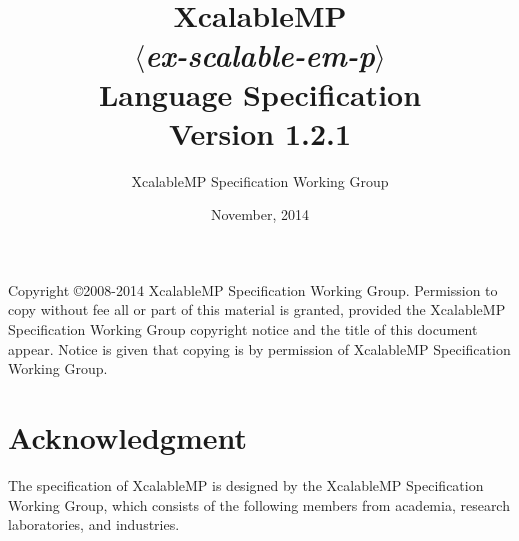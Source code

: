 \documentclass[a4paper,11pt,twoside]{report}
\title{{\Huge XcalableMP}\\
$\langle${\it ex-scalable-em-p}$\rangle$\\
Language Specification\\
\vspace{2cm}
Version 1.2.1\\}
\author{
\Large XcalableMP Specification Working Group\\
}
\date{\vspace{4cm}\Large November, 2014}
\def\XMP{XcalableMP}
\begin{document}
\maketitle

Copyright \copyright 2008-2014 {\XMP} Specification Working Group.
Permission to copy without fee all or part of this material is granted,
provided the {\XMP} Specification Working Group copyright notice and the
title of this document appear. Notice is given that copying is by permission
of {\XMP} Specification Working Group.

\clearpage

\cleardoublepage

\tableofcontents
\listoffigures
\listoftables

\chapter*{Acknowledgment}

The specification of {\XMP} is designed by the {\XMP} Specification
Working Group, which consists of the following members from academia,
research laboratories, and industries.
\end{document}
